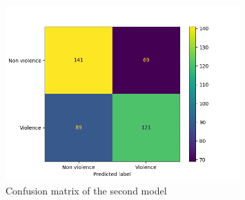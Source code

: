 \begin{figure}[]
    \centering
    \includegraphics[width=0.8\textwidth]{images/731a-2D35-86ad-conf_matrix.png}
    \caption{Confusion matrix of the second model}
    \label{fig:Second2DCNNMatrix}
\end{figure}

\pagebreak
